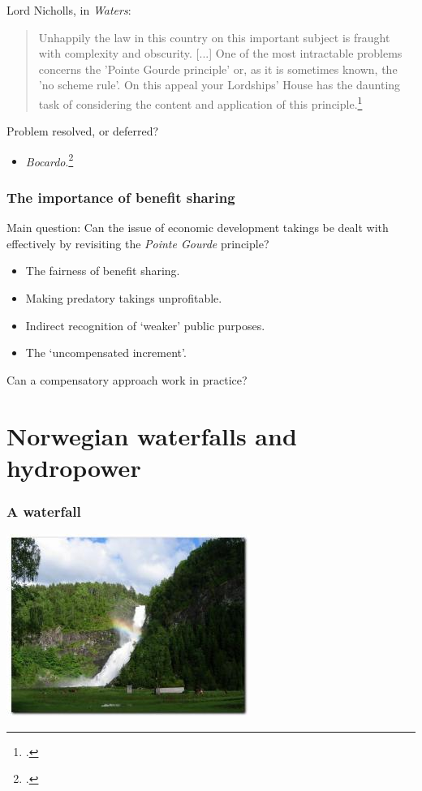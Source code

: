 \documentclass{beamer}
\begin{document}
\begin{frame}
Lord Nicholls, in {\it Waters}:
\begin{quote}
Unhappily the law in this country on this important subject is fraught with complexity and obscurity. [...] One of the most intractable problems concerns the 'Pointe Gourde principle' or, as it is sometimes known, the 'no scheme rule'. On this appeal your Lordships' House has the daunting task of considering the content and application of this principle.\footcite[2]{waters04}
\end{quote}
Problem resolved, or deferred? \\
\pause
\begin{itemize} 
\item {\it Bocardo}.\footcite{bocardo10} \\
\end{itemize}
\end{frame}

\begin{frame}
\frametitle{The importance of benefit sharing}
Main question: Can the issue of economic development takings be dealt with effectively by revisiting the {\it Pointe Gourde} principle? \pause
\begin{itemize}
\item The fairness of benefit sharing. 
\item Making predatory takings unprofitable.
\item Indirect recognition of `weaker' public purposes.
\item The `uncompensated increment'.
\end{itemize}
\pause
Can a compensatory approach work in practice?
\end{frame}

\section{Norwegian waterfalls and hydropower}

\begin{frame}
\frametitle{A waterfall}
\includegraphics[scale=0.7]{huldefossen.jpg}
\end{frame}
\end{document}
